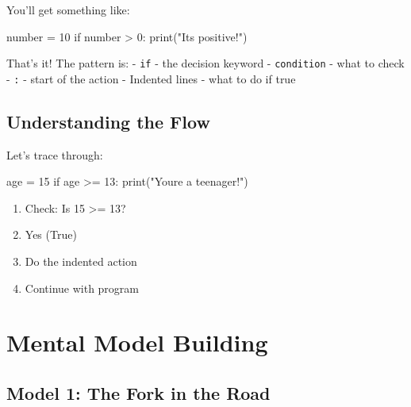 \documentclass[
  letterpaper,
  DIV=11,
  numbers=noendperiod,
  oneside]{scrreprt}
\newenvironment{Shaded}{}{}
\newcommand{\BuiltInTok}[1]{\textcolor[rgb]{0.84,0.23,0.29}{#1}}
\newcommand{\ControlFlowTok}[1]{\textcolor[rgb]{0.84,0.23,0.29}{#1}}
\newcommand{\DecValTok}[1]{\textcolor[rgb]{0.00,0.36,0.77}{#1}}
\newcommand{\NormalTok}[1]{\textcolor[rgb]{0.14,0.16,0.18}{#1}}
\newcommand{\OperatorTok}[1]{\textcolor[rgb]{0.14,0.16,0.18}{#1}}
\newcommand{\StringTok}[1]{\textcolor[rgb]{0.01,0.18,0.38}{#1}}
\providecommand{\tightlist}{%
  \setlength{\itemsep}{0pt}\setlength{\parskip}{0pt}}\usepackage{longtable,booktabs,array}
\begin{document}
You'll get something like:

\begin{Shaded}
\begin{Highlighting}[]
\NormalTok{number }\OperatorTok{=} \DecValTok{10}
\ControlFlowTok{if}\NormalTok{ number }\OperatorTok{\textgreater{}} \DecValTok{0}\NormalTok{:}
    \BuiltInTok{print}\NormalTok{(}\StringTok{"It\textquotesingle{}s positive!"}\NormalTok{)}
\end{Highlighting}
\end{Shaded}

That's it! The pattern is: - \texttt{if} - the decision keyword -
\texttt{condition} - what to check - \texttt{:} - start of the action -
Indented lines - what to do if true

\subsection{Understanding the Flow}\label{understanding-the-flow-1}

Let's trace through:

\begin{Shaded}
\begin{Highlighting}[]
\NormalTok{age }\OperatorTok{=} \DecValTok{15}
\ControlFlowTok{if}\NormalTok{ age }\OperatorTok{\textgreater{}=} \DecValTok{13}\NormalTok{:}
    \BuiltInTok{print}\NormalTok{(}\StringTok{"You\textquotesingle{}re a teenager!"}\NormalTok{)}
\end{Highlighting}
\end{Shaded}

\begin{enumerate}
\def\labelenumi{\arabic{enumi}.}
\tightlist
\item
  Check: Is 15 \textgreater= 13?
\item
  Yes (True)
\item
  Do the indented action
\item
  Continue with program
\end{enumerate}

\section{Mental Model Building}\label{mental-model-building-3}

\subsection{Model 1: The Fork in the
Road}\label{model-1-the-fork-in-the-road}
\end{document}
